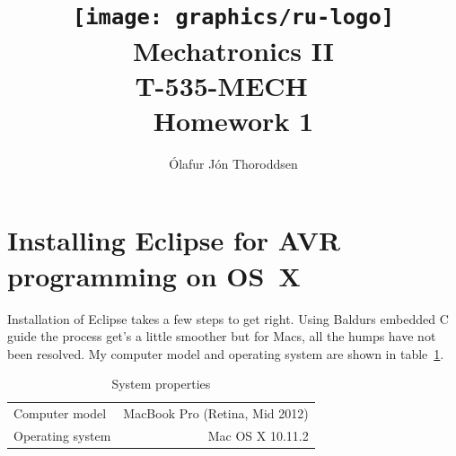 \documentclass[11pt,a4paper,titlepage]{article}
\author{Ólafur Jón Thoroddsen}  %
\title{\texttt{[image: graphics/ru-logo]}\\\vspace{10mm}
	Mechatronics II\\T-535-MECH \ \\Homework 1}  %
\begin{document}
	\maketitle
	
\section{Installing Eclipse for AVR programming on OS~X}

Installation of Eclipse takes a few steps to get right. Using Baldurs embedded C guide\cite{baldurscguide} the process get's a little smoother but for Macs, all the humps have not been resolved.
My computer model and operating system are shown in table~\ref{tab:computer}.

\begin{table}[h]
	\centering
	\begin{tabular}{lr}
		\toprule
		Computer model	&	MacBook Pro (Retina, Mid 2012)\\
		Operating system	&	Mac OS X 10.11.2\\
		\bottomrule
	\end{tabular}
	\caption{System properties}
	\label{tab:computer}
\end{table}
\end{document}
